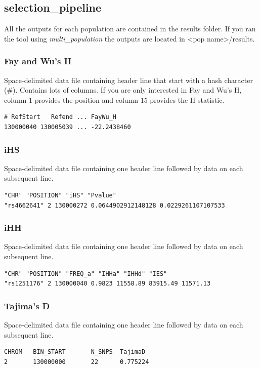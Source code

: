 \documentclass[a4paper,10pt]{article}
\begin{document}
\subsection{selection\_pipeline}
All the outputs for each population are contained in the results folder. If you ran the tool using \emph{multi\_population} the outputs are located in <pop name>/results. 
\subsubsection{Fay and Wu's H}
Space-delimited data file containing header line that start with a hash character (\#). Contains lots of columns. If you are only interested in Fay and Wu's H, column 1 provides the position and column 15 provides the H statistic. \\
\begin{verbatim}
# RefStart   Refend ... FayWu_H
130000040 130005039 ... -22.2438460
\end{verbatim}
\subsubsection{iHS}
Space-delimited data file containing one header line followed by data on each subsequent line.\\
\begin{verbatim}
"CHR" "POSITION" "iHS" "Pvalue"
"rs4662641" 2 130000272 0.0644902912148128 0.0229261107107533
\end{verbatim}
\subsubsection{iHH}
Space-delimited data file containing one header line followed by data on each subsequent line.\\
\begin{verbatim}
"CHR" "POSITION" "FREQ_a" "IHHa" "IHHd" "IES"
"rs1251176" 2 130000040 0.9823 11558.89 83915.49 11571.13
\end{verbatim}
\subsubsection{Tajima's D}
Space-delimited data file containing one header line followed by data on each subsequent line.\\
\begin{verbatim}
CHROM   BIN_START       N_SNPS  TajimaD
2       130000000       22      0.775224
\end{verbatim}
\end{document}
